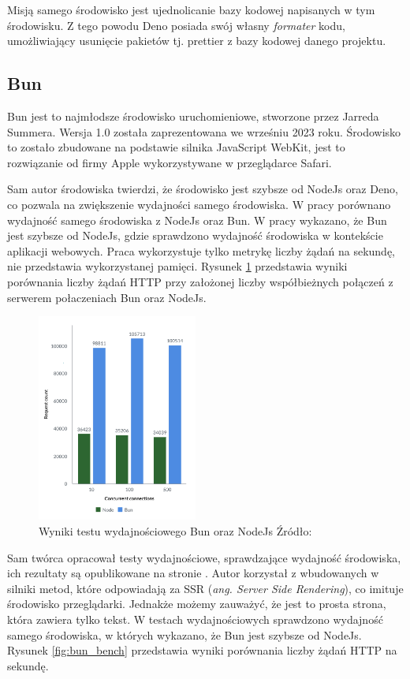 Misją samego środowisko jest ujednolicanie bazy kodowej napisanych w tym środowisku. Z tego powodu Deno posiada swój własny \textit{formater} kodu, umożliwiający usunięcie pakietów tj. prettier z bazy kodowej danego projektu. 

\subsection{Bun}
Bun \cite{bun} jest to najmłodsze środowisko uruchomieniowe, stworzone przez Jarreda Summera. Wersja 1.0 została zaprezentowana we wrześniu 2023 roku. Środowisko to zostało zbudowane na podstawie silnika JavaScript WebKit, jest to rozwiązanie od firmy Apple wykorzystywane w przeglądarce Safari.

Sam autor środowiska twierdzi, że środowisko jest szybsze od NodeJs oraz Deno, co pozwala na zwiększenie wydajności samego środowiska. W pracy \cite{NodeAndBun} porównano wydajność samego środowiska z NodeJs oraz Bun. W pracy wykazano, że Bun jest szybsze od NodeJs, gdzie sprawdzono wydajność środowiska w kontekście aplikacji webowych. Praca wykorzystuje tylko metrykę liczby żądań na sekundę, nie przedstawia wykorzystanej pamięci. Rysunek \ref{fig:bun_vs_node} przedstawia wyniki porównania liczby żądań HTTP przy założonej liczby współbieżnych połączeń z serwerem połaczeniach Bun oraz NodeJs.

\begin{figure}[H]
  \centering
  \includegraphics[width=0.47\textwidth]{Figures/bun_bench_node.png}
  \caption{Wyniki testu wydajnościowego Bun oraz NodeJs Źródło:\cite{bun_test}}
  \label{fig:bun_vs_node}
\end{figure}

Sam twórca opracował testy wydajnościowe, sprawdzające wydajność środowiska, ich rezultaty są opublikowane na stronie \cite{bun_test}. Autor korzystał z wbudowanych w silniki metod, które odpowiadają za SSR (\textit{ang. Server Side Rendering}), co imituje środowisko przeglądarki. Jednakże możemy zauważyć, że jest to prosta strona, która zawiera tylko tekst. W testach wydajnościowych sprawdzono wydajność samego środowiska, w których wykazano, że Bun jest szybsze od NodeJs. Rysunek \ref{fig:bun_bench} przedstawia wyniki porównania liczby żądań HTTP na sekundę.

